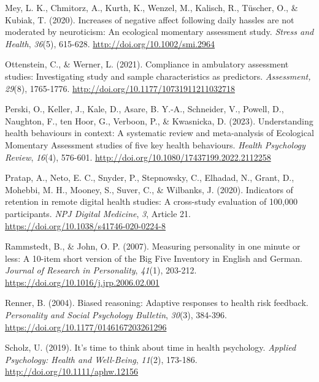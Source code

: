 \documentclass[authordate, empirical]{jote-new-article}
\begin{document}
	Mey, L. K., Chmitorz, A., Kurth, K., Wenzel, M., Kalisch, R., Tüscher, O., \& Kubiak, T. (2020). Increases of negative affect following daily hassles are not moderated by neuroticism: An ecological momentary assessment study. \emph{Stress and Health},\emph{ 36}(5), 615-628. \href{http://doi.org/10.1002/smi.2964}{http://doi.org/10.1002/smi.2964}



	Ottenstein, C., \& Werner, L. (2021). Compliance in ambulatory assessment studies: Investigating study and sample characteristics as predictors. \emph{Assessment, 29}(8), 1765-1776. \href{http://doi.org/10.1177/10731911211032718}{http://doi.org/10.1177/10731911211032718}



	Perski, O., Keller, J., Kale, D., Asare, B. Y.-A., Schneider, V., Powell, D., Naughton, F., ten Hoor, G., Verboon, P., \& Kwasnicka, D. (2023). Understanding health behaviours in context: A systematic review and meta-analysis of Ecological Momentary Assessment studies of five key health behaviours. \emph{Health Psychology Review},\emph{ 16}(4), 576-601. \href{http://doi.org/10.1080/17437199.2022.2112258}{http://doi.org/10.1080/17437199.2022.2112258}



	Pratap, A., Neto, E. C., Snyder, P., Stepnowsky, C., Elhadad, N., Grant, D., Mohebbi, M. H., Mooney, S., Suver, C., \& Wilbanks, J. (2020). Indicators of retention in remote digital health studies: A cross-study evaluation of 100,000 participants. \emph{NPJ Digital Medicine},\emph{ 3}, Article 21. \href{https://doi.org/10.1038/s41746-020-0224-8}{https://doi.org/10.1038/s41746-020-0224-8}



	Rammstedt, B., \& John, O. P. (2007). Measuring personality in one minute or less: A 10-item short version of the Big Five Inventory in English and German. \emph{Journal of Research in Personality},\emph{ 41}(1), 203-212. \href{https://doi.org/10.1016/j.jrp.2006.02.001}{https://doi.org/10.1016/j.jrp.2006.02.001}



	Renner, B. (2004). Biased reasoning: Adaptive responses to health risk feedback. \emph{Personality and Social Psychology Bulletin},\emph{ 30}(3), 384-396. \href{https://doi.org/10.1177/0146167203261296}{https://doi.org/10.1177/0146167203261296}



	Scholz, U. (2019). It's time to think about time in health psychology. \emph{Applied Psychology: Health and Well-Being},\emph{ 11}(2), 173-186. \href{http://doi.org/10.1111/aphw.12156}{http://doi.org/10.1111/aphw.12156}
\end{document}
